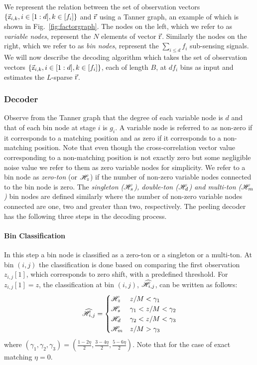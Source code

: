 We represent the relation between the set of observation vectors $\{\vec{\mathrm{z}}_{i,k},i\in[1:d],k\in[f_i]\}$ and $\vec{\mathrm{r}}$ using a Tanner graph, an example of which is shown in Fig.~\ref{fig:factorgraph}. The nodes on the left, which we refer to as {\it variable nodes}, represent the $N$ elements of vector $\vec{\mathrm{r}}$. Similarly the nodes on the right, which we refer to as {\it bin nodes}, represent the $\sum_{i\leq d} f_i$ sub-sensing signals. We will now describe the decoding algorithm which takes the set of observation vectors $\{\vec{\mathrm{z}}_{i,k},i\in[1:d],k\in[f_i]\}$, each of length $B$, at $df_i$ bins as input and estimates the $L$-sparse $\vec{\mathrm{r}}$.	

\subsubsection{Decoder}			
	Observe from the Tanner graph that the degree of each variable node is $d$ and that of each bin node at stage $i$ is $g_i$. A variable node is referred to as non-zero if it corresponds to a matching position and as zero if it corresponds to a non-matching position. Note that even though the cross-correlation vector value corresponding to a non-matching position is not exactly zero but some negligible noise value we refer to them as zero variable nodes for simplicity. We refer to a bin node as {\it zero-ton} (or $\mathscr{H}_z$) if the number of non-zero variable nodes connected to the bin node is zero. The {\it singleton ($\mathscr{H}_s$), double-ton ($\mathscr{H}_d$) and multi-ton ($\mathscr{H}_m$)} bin nodes are defined similarly where the number of non-zero variable nodes connected are one, two and greater than two, respectively. The peeling decoder has the following three steps in the decoding process.

\paragraph*{Bin Classification} In this step a bin node is classified as a zero-ton or a singleton or a multi-ton. At bin $(i,j)$ the classification is done based on  comparing the first observation $z_{i,j}[1]$, which corresponds to zero shift, with a predefined threshold. For $z_{i,j}[1]=z$, the classification at bin $(i,j)$, $\widehat{\mathscr{H}}_{i,j}$, can be written as follows:
\begin{align}
\label{Eqn:BinClassifApprox}
\widehat{\mathscr{H}}_{i,j}=
\begin{cases}
\mathscr{H}_z &  	 z/M < \gamma_1\\
\mathscr{H}_s &	  \gamma_1 < z/M < \gamma_2  \\
\mathscr{H}_d  &    \gamma_2  < z/M <  \gamma_3\\
\mathscr{H}_m &      z/M > \gamma_3\\
\end{cases}
\end{align}
where $(\gamma_1,\gamma_2,\gamma_3)=(\frac{1-2\eta}{2},\frac{3-4\eta}{2},\frac{5-6\eta}{2})$. Note that for the case of exact matching $\eta=0$.
